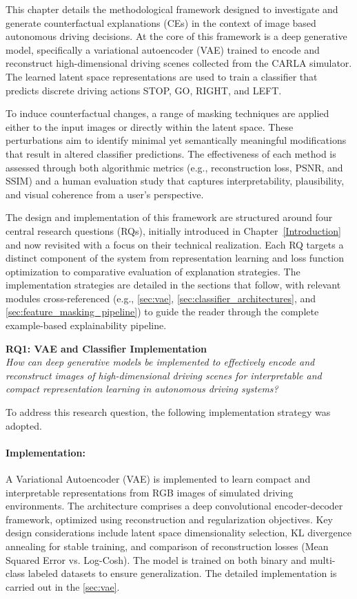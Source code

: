This chapter details the methodological framework designed to investigate and generate counterfactual explanations (CEs) in the context of image based autonomous driving decisions. At the core of this framework is a deep generative model, specifically a variational autoencoder (VAE) trained to encode and reconstruct high-dimensional driving scenes collected from the CARLA simulator. The learned latent space representations are used to train a classifier that predicts discrete driving actions STOP, GO, RIGHT, and LEFT.

To induce counterfactual changes, a range of masking techniques are applied either to the input images or directly within the latent space. These perturbations aim to identify minimal yet semantically meaningful modifications that result in altered classifier predictions. The effectiveness of each method is assessed through both algorithmic metrics (e.g., reconstruction loss, PSNR, and SSIM) and a human evaluation study that captures interpretability, plausibility, and visual coherence from a user’s perspective.

The design and implementation of this framework are structured around four central research questions (RQs), initially introduced in Chapter~\ref{Introduction} and now revisited with a focus on their technical realization. Each RQ targets a distinct component of the system from representation learning and loss function optimization to comparative evaluation of explanation strategies. The implementation strategies are detailed in the sections that follow, with relevant modules cross-referenced (e.g., \cref{sec:vae}, \cref{sec:classifier_architectures}, and \cref{sec:feature_masking_pipeline}) to guide the reader through the complete example-based explainability pipeline.



\textbf{RQ1: VAE and Classifier Implementation} \\
\textit{How can deep generative models be implemented to effectively encode and reconstruct images of high-dimensional driving scenes for interpretable and compact representation learning in autonomous driving systems?}

To address this research question, the following implementation strategy was adopted.

\paragraph{Implementation:} A Variational Autoencoder (VAE) is implemented to learn compact and interpretable representations from RGB images of simulated driving environments. The architecture comprises a deep convolutional encoder-decoder framework, optimized using reconstruction and regularization objectives. Key design considerations include latent space dimensionality selection, KL divergence annealing for stable training, and comparison of reconstruction losses (Mean Squared Error vs. Log-Cosh). The model is trained on both binary and multi-class labeled datasets to ensure generalization. The detailed implementation is carried out in the \cref{sec:vae}.

